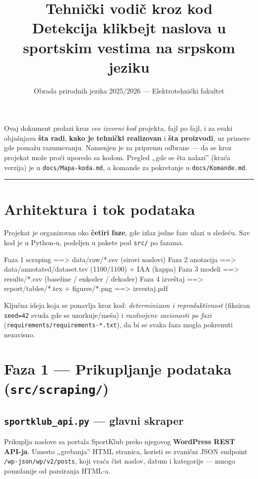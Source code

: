 \documentclass[11pt,a4paper]{article}
\title{\textbf{Tehnički vodič kroz kod}\\[2pt]
\large Detekcija klikbejt naslova u sportskim vestima na srpskom jeziku}
\author{Obrada prirodnih jezika 2025/2026 --- Elektrotehnički fakultet}
\date{}
\newcommand{\kod}[1]{\texttt{#1}}
\begin{document}
\maketitle

\noindent
Ovaj dokument prolazi kroz \emph{ceo izvorni kod} projekta, fajl po fajl, i za svaki
objašnjava \textbf{šta radi}, \textbf{kako je tehnički realizovan} i \textbf{šta
proizvodi}, uz primere gde pomažu razumevanju. Namenjen je za pripremu odbrane --- da
se kroz projekat može proći uporedo sa kodom. Pregled „gde se šta nalazi'' (kraća
verzija) je u \texttt{docs/Mapa-koda.md}, a komande za pokretanje u
\texttt{docs/Komande.md}.

\tableofcontents
\vspace{4mm}\hrule

\section{Arhitektura i tok podataka}
Projekat je organizovan oko \textbf{četiri faze}, gde izlaz jedne faze ulazi u
sledeću. Sav kod je u Python-u, podeljen u pakete pod \kod{src/} po fazama.

\begin{code}
Faza 1  scraping        ==>  data/raw/*.csv            (sirovi naslovi)
Faza 2  anotacija       ==>  data/annotated/dataset.tsv (1100/1100) + IAA (kappa)
Faza 3  modeli          ==>  results/*.csv             (baseline / enkoder / dekoder)
Faza 4  izveštaj        ==>  report/tables/*.tex + figures/*.png ==> izvestaj.pdf
\end{code}

\noindent
Ključna ideja koja se ponavlja kroz kod: \emph{determinizam i reproduktivnost}
(fiksiran \kod{seed=42} svuda gde se uzorkuje/meša) i \emph{razdvojene zavisnosti po
fazi} (\kod{requirements/requirements-*.txt}), da bi se svaka faza mogla pokrenuti
nezavisno.

\section{Faza 1 --- Prikupljanje podataka (\texttt{src/scraping/})}

\subsection{\texttt{sportklub\_api.py} --- glavni skraper}
Prikuplja naslove sa portala SportKlub preko njegovog \textbf{WordPress REST API-ja}.
Umesto „grebanja'' HTML stranica, koristi se zvanični JSON endpoint
\kod{/wp-json/wp/v2/posts}, koji vraća čist naslov, datum i kategorije --- mnogo
pouzdanije od parsiranja HTML-a.
\end{document}
